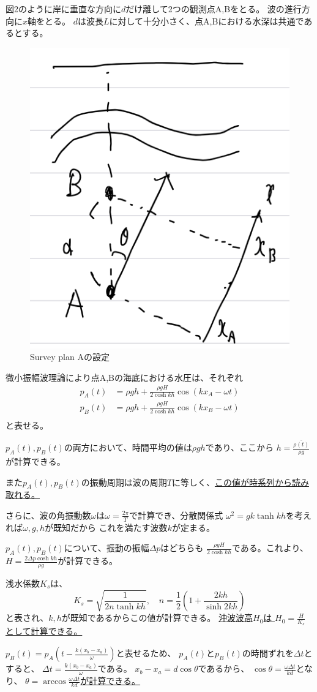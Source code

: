\documentclass[a4paper]{jsarticle}
\begin{document}
\subsubsection{}
図2のように岸に垂直な方向に$d$だけ離して2つの観測点A,Bをとる。
波の進行方向に$x$軸をとる。
$d$は波長$L$に対して十分小さく、点A,Bにおける水深は共通であるとする。\par
\begin{figure}[htb]
  \centering
  \includegraphics[width=0.3\hsize]{fig2.png}
  \caption{Survey plan Aの設定}
\end{figure}
微小振幅波理論により点A,Bの海底における水圧は、それぞれ
\begin{align}
  p_A(t) &= \rho g h + \frac{\rho g H}{2 \cosh k h} \cos (k x_A - \omega t) \\
  p_B(t) &= \rho g h + \frac{\rho g H}{2 \cosh k h} \cos (k x_B - \omega t) \\
\end{align}
と表せる。\par
$p_A(t), p_B(t)$の両方において、時間平均の値は$\rho g h$であり、ここから
$h = \frac{\overline{\rho (t)}}{\rho g}$が計算できる。\par
また$p_A(t),p_B(t)$の振動周期は波の周期$T$に等しく、\underline{この値が時系列から読み取れる。}\par
さらに、波の角振動数$\omega$は$\omega = \frac{2 \pi}{T}$で計算でき、分散関係式
$\omega^2 = g k \tanh k h$を考えれば$\omega, g, h$が既知だから
これを満たす波数$k$が定まる。\par
$p_A(t),p_B(t)$について、振動の振幅$\varDelta p$はどちらも
$\frac{\rho g H}{2 \cosh k h}$である。これより、
$H = \frac{2 \varDelta p \cosh k h}{\rho g}$が計算できる。\par
浅水係数$K_s$は、
\begin{equation}
  K_s = \sqrt{\frac{1}{2 n \tanh k h}},\quad
  n = \frac{1}{2} \left(1 + \frac{2 k h}{\sinh 2 k h}\right)
\end{equation}
と表され、$k,h$が既知であるからこの値が計算できる。
\underline{沖波波高$H_0$は
$H_0 = \frac{H}{K_s}$として計算できる。} \par
$p_B(t) = p_A(t - \frac{k (x_b - x_a)}{\omega})$と表せるため、
$p_A(t)$と$p_B(t)$の時間ずれを$\varDelta t$とすると、
$\varDelta t = \frac{k(x_b - x_a)}{\omega}$である。
$x_b - x_a = d \cos \theta$であるから、
$\cos \theta = \frac{\omega \varDelta t}{k d}$となり、
\underline{$\theta = \arccos \frac{\omega \varDelta t}{k d}$が計算できる。}
\end{document}

